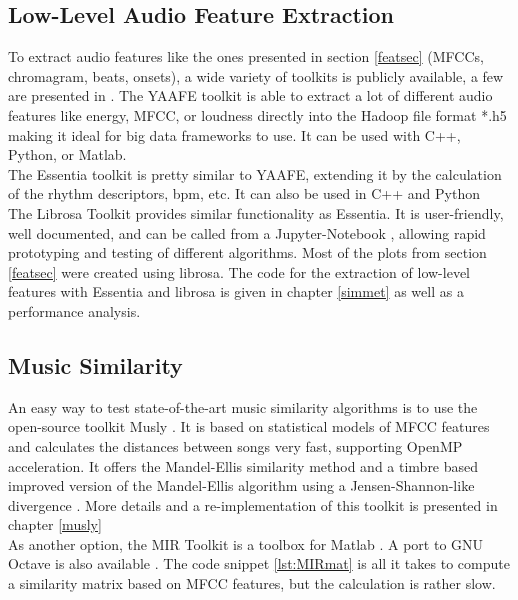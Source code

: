 \subsection{Low-Level Audio Feature Extraction}
To extract audio features like the ones presented in section \ref{featsec} (MFCCs, chromagram, beats, onsets), a wide variety of toolkits is publicly available, a few are presented in \cite{audiofeattoolb}.
The YAAFE toolkit \cite{yaafe1} is able to extract a lot of different audio features like energy, MFCC, or loudness directly into the Hadoop file format *.h5 making it ideal for big data frameworks to use. It can be used with C++, Python, or Matlab.\\
The Essentia toolkit \cite{essentia1} is pretty similar to YAAFE, extending it by the calculation of the rhythm descriptors, bpm, etc. It can also be used in C++ and Python\\
The Librosa Toolkit provides similar functionality \cite{labrosa1} as Essentia. It is user-friendly, well documented, and can be called from a Jupyter-Notebook \cite{jupyter}, allowing rapid prototyping and testing of different algorithms. Most of the plots from section \ref{featsec} were created using librosa. The code for the extraction of low-level features with Essentia and librosa is given in chapter \ref{simmet} as well as a performance analysis.\\

\subsection{Music Similarity}

An easy way to test state-of-the-art music similarity algorithms is to use the open-source toolkit Musly \cite{musly1}. It is based on statistical models of MFCC features and calculates the distances between songs very fast, supporting OpenMP acceleration. It offers the Mandel-Ellis similarity method \cite{mandelellis1} and a timbre based improved version of the Mandel-Ellis algorithm using a Jensen-Shannon-like divergence \cite{musly2}. More details and a re-implementation of this toolkit is presented in chapter \ref{musly}\\
As another option, the MIR Toolkit \cite{mirtoolbox1} is a toolbox for Matlab \cite{matl1}. A port to GNU Octave \cite{octave1} is also available \cite{mirtoolbox2}. The code snippet \ref{lst:MIRmat} is all it takes to compute a similarity matrix based on MFCC features, but the calculation is rather slow.

